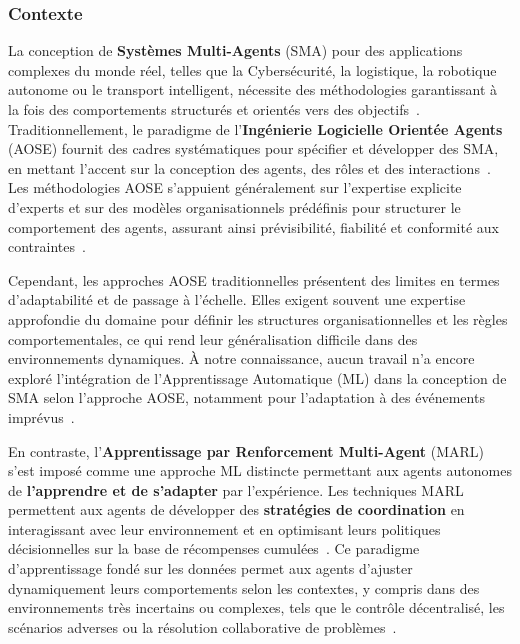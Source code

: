 
\subsubsection{Contexte}


La conception de \textbf{Systèmes Multi-Agents} (SMA) pour des applications complexes du monde réel, telles que la Cybersécurité, la logistique, la robotique autonome ou le transport intelligent, nécessite des méthodologies garantissant à la fois des comportements structurés et orientés vers des objectifs~\cite{Jamont2O15}. Traditionnellement, le paradigme de l'\textbf{Ingénierie Logicielle Orientée Agents} (AOSE) fournit des cadres systématiques pour spécifier et développer des SMA, en mettant l'accent sur la conception des agents, des rôles et des interactions~\cite{Pavon2003, Bernon2005}. Les méthodologies AOSE s'appuient généralement sur l'expertise explicite d'experts et sur des modèles organisationnels prédéfinis pour structurer le comportement des agents, assurant ainsi prévisibilité, fiabilité et conformité aux contraintes~\cite{Hindriks2014}.

Cependant, les approches AOSE traditionnelles présentent des limites en termes d'adaptabilité et de passage à l'échelle. Elles exigent souvent une expertise approfondie du domaine pour définir les structures organisationnelles et les règles comportementales, ce qui rend leur généralisation difficile dans des environnements dynamiques. À notre connaissance, aucun travail n'a encore exploré l'intégration de l'Apprentissage Automatique (ML) dans la conception de SMA selon l'approche AOSE, notamment pour l'adaptation à des événements imprévus~\cite{Garcia2004}.

En contraste, l'\textbf{Apprentissage par Renforcement Multi-Agent} (MARL) s'est imposé comme une approche ML distincte permettant aux agents autonomes de \textbf{l'apprendre et de s'adapter} par l'expérience. Les techniques MARL permettent aux agents de développer des \textbf{stratégies de coordination} en interagissant avec leur environnement et en optimisant leurs politiques décisionnelles sur la base de récompenses cumulées~\cite{Zhang2021}. Ce paradigme d'apprentissage fondé sur les données permet aux agents d'ajuster dynamiquement leurs comportements selon les contextes, y compris dans des environnements très incertains ou complexes, tels que le contrôle décentralisé, les scénarios adverses ou la résolution collaborative de problèmes~\cite{Papoudakis2021}.

